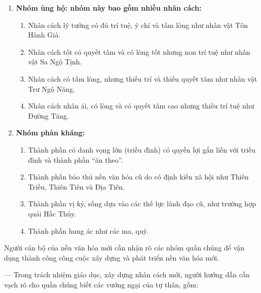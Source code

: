 \begin{enumerate}[label=\itshape\arabic*\upshape)]

    \item {\bf Nhóm ủng hộ: nhóm này bao gồm nhiều nhân cách:}

    \begin{enumerate}[label=\itshape\alph*\upshape/]

        \item Nhân cách lý tưởng có đủ trí tuệ, ý chí và tấm lòng như nhân vật Tôn Hành Giả.

        \item Nhân cách tốt có quyết tâm và có lòng tốt nhưng non trí tuệ như nhân vật Sa Ngộ Tịnh.

        \item Nhân cách có tấm lòng, nhưng thiếu trí và thiếu quyết tâm như nhân vật Trư Ngộ Năng.

        \item Nhân cách nhân ái, có lòng và có quyết tâm cao nhưng thiếu trí tuệ như Đường Tăng.
    \end{enumerate}

    \item {\bf Nhóm phản kháng:}

    \begin{enumerate}[label=\itshape\alph*\upshape/]

        \item Thành phần có danh vọng lớn (triều đình) có quyền lợi gắn liền với triều đình và thành phần ``ăn theo''.

        \item Thành phần bảo thủ nền văn hóa cũ do có định kiến xã hội như Thiên Triều, Thiên Tiên và Địa Tiên.

        \item Thành phần vị kỷ, sống dựa vào các thế lực lãnh đạo cũ, như trường hợp quái Hắc Thủy.

        \item Thành phần hung ác như các ma, quỷ.
    \end{enumerate}
\end{enumerate}

Người cán bộ của nền văn hóa mới cần nhận rõ các nhóm quần chúng để vận dụng thành công công cuộc xây dựng và phát triển nền văn hóa mới.

— Trong trách nhiệm giáo dục, xây dựng nhân cách mới, người hướng dẫn cần vạch rõ cho quần chúng biết các vướng ngại của tự thân, gồm:

